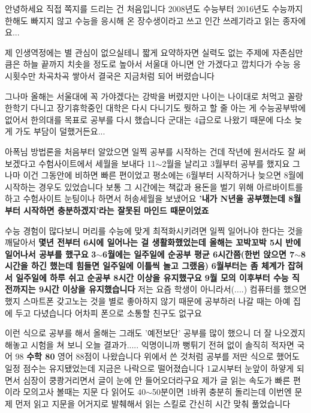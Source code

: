    안녕하세요 직접 쪽지를 드리는 건 처음입니다
    2008년도 수능부터 2016년도 수능까지 한해도 빠지지 않고 수능을 응시해 온
    장수생이라고 쓰고 인간 쓰레기라고 읽는 종자에요...
    \vspace{5mm}

    제 인생역정에는 별 관심이 없으실테니 짧게 요약하자면
    실력도 없는 주제에 자존심만큼은 하늘 끝까지 치솟을 정도로 높아서 서울대 아니면 안 가겠다고 깝치다가
    수능 응시횟수만 차곡차곡 쌓아서 결국은 지금처럼 되어 버렸습니다
    \vspace{5mm}

    그나마 올해는 서울대에 꼭 가야겠다는 강박을 버렸지만
    나이는 나이대로 처먹고 꼴랑 한학기 다니고 장기휴학중인 대학은 다시 다니기도 뭣하고
    할 줄 아는 게 수능공부밖에 없어서 한의대를 목표로 공부를 다시 했습니다
    군대는 4급으로 나왔기 때문에 다소 늦게 가도 부담이 덜했거든요...
    \vspace{5mm}

    아폭님 방법론을 처음부터 알았으면 일찍 공부를 시작하는 건데
    작년에 원서라도 잘 써보겠다고 수험사이트에서 세월을 보내다 11$\sim$2월을 날리고 3월부터 공부를 했지요
    그나마 이건 그동안에 비하면 빠른 편이었고 평소에는 6월부터 시작하거나 늦으면 8월에 시작하는 경우도 있었습니다
    보통 그 시간에는 책값과 용돈을 벌기 위해 아르바이트를 하고 수험사이트 눈팅이나 하면서 허송세월을 보냈어요
    \textbf{'내가 N년을 공부했는데 8월부터 시작하면 충분하겠지'라는 잘못된 마인드 때문이었죠}
    \vspace{5mm}

    수능 경험이 많다보니 머리를 수능에 맞게 최적화시키려면 일찍 일어나야 한다는 것을 깨달아서
    \textbf{몇년 전부터 6시에 일어나는 걸 생활화했었는데 올해는 꼬박꼬박 5시 반에 일어나서 공부를 했구요}
    \textbf{3$\sim$6월에는 일주일에 순공부 평균 6시간쯤(한번 앉으면 7$\sim$8시간을 하긴 했는데 힘들면 일주일에 이틀씩 놀고 그랬음)}
    \textbf{6월부터는 좀 체계가 잡혀서 일주일에 하루 쉬고 순공부 8시간 이상을 유지했구요}
    \textbf{9월 모의 이후부터 수능 직전까지는 9시간 이상을 유지했습니다}
    저는 요즘 학생이 아니라서(....) 컴퓨터를 했으면 했지 스마트폰 갖고노는 것을 별로 좋아하지 않기 때문에
    공부하러 나갈 때는 아예 집에 두고 다녔습니다 어차피 폰으로 소통할 친구도 없구요
    \vspace{5mm}

    이런 식으로 공부를 해서 올해는 그래도 '예전보단' 공부를 많이 했으니 더 잘 나오겠지 해놓고 시험을 쳐 보니 오늘 결과가.....
    익명이니까 뻥튀기 전혀 없이 솔직히 적자면 국어 98 \textbf{수학 80} 영어 88점이 나왔습니다
    위에서 쓴 것처럼 공부를 저딴 식으로 했어도 일정 점수는 유지됐었는데 지금은 나락으로 떨어졌습니다
    1교시부터 눈앞이 하얗게 되면서 심장이 쿵쾅거리면서 글이 눈에 안 들어오더라구요
    제가 글 읽는 속도가 빠른 편이라 모의고사 볼때는 지문 다 읽어도 40$\sim$50분이면 1바퀴 충분히 돌리는데
    이번엔 문제 먼저 읽고 지문을 어거지로 발췌해서 읽는 스킬로 간신히 시간 맞춰 풀었습니다
    \vspace{5mm}

